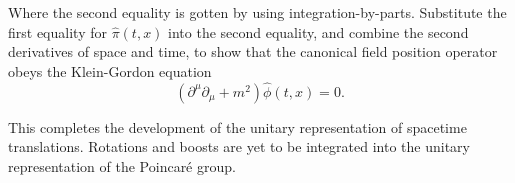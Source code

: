\noindent Where the second equality is gotten by using integration-by-parts. Substitute the first equality for $\hat{\pi}(t, x)$ into the second equality, and combine the second derivatives of space and time, to show that the canonical field position operator obeys the Klein-Gordon equation
\begin{equation}
(\partial^\mu \partial_\mu + m^2 ) \hat{\phi}(t, x) = 0.
\end{equation}

\noindent This completes the development of the unitary representation of spacetime translations. Rotations and boosts are yet to be integrated into the unitary representation of the Poincar\'e group.